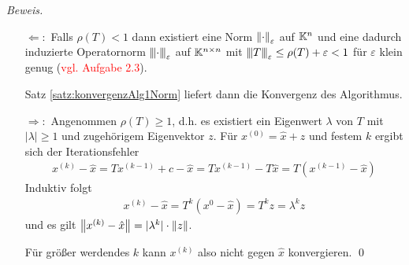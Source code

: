 \textit{Beweis.} 
\begin{enumerate}
  \item[$\Leftarrow:$] 
    Falls $\rho(T)<1$ dann existiert eine Norm $\vertn{2}{\cdot}_\varepsilon$ auf $\mathbb K^n$ 
    und eine dadurch induzierte Operatornorm $\vertn{3}{\cdot}_\varepsilon$ auf $\mathbb K^{n\times n}$ 
    mit $\vertn{3}{T}_\varepsilon \leq \rho(T) + \varepsilon < 1$ für $\varepsilon$ klein genug 
    (\textcolor{red}{vgl. Aufgabe 2.3}). 

    Satz \ref{satz:konvergenzAlg1Norm} liefert dann die Konvergenz des Algorithmus. 

  \item[$\Rightarrow:$] 
    Angenommen $\rho(T)\geq 1$, d.h. es existiert ein Eigenwert $\lambda$ von $T$ 
    mit $|\lambda|\geq 1$ und zugehörigem Eigenvektor $z$. Für $x^{(0)}=\hat{x}+z$ und festem $k$ 
    ergibt sich der Iterationsfehler
    \begin{align*}
      x^{(k)}-\hat{x} 
      = Tx^{(k-1)}+c-\hat{x} 
      = Tx^{(k-1)}-T\hat{x} 
      = T(x^{(k-1)}-\hat{x})
    \end{align*}
    Induktiv folgt  
    \begin{align*}
      x^{(k)}-\hat{x} 
      = T^k(x^{0}-\hat{x})
      =T^kz
      =\lambda^kz
    \end{align*}
    und es gilt $\vertn{2}{x^{(k)}-\hat{x}}=|\lambda^k|\cdot\vertn{2}{z}$.

    Für größer werdendes $k$ kann $x^{(k)}$ also nicht gegen $\hat{x}$ konvergieren. 
    \qed
\end{enumerate}

